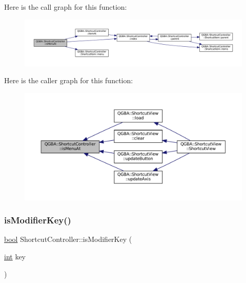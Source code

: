 Here is the call graph for this function\+:
\nopagebreak
\begin{figure}[H]
\begin{center}
\leavevmode
\includegraphics[width=350pt]{class_q_g_b_a_1_1_shortcut_controller_afcb396dd1166444596103d04c85b5b7d_cgraph}
\end{center}
\end{figure}
Here is the caller graph for this function\+:
\nopagebreak
\begin{figure}[H]
\begin{center}
\leavevmode
\includegraphics[width=350pt]{class_q_g_b_a_1_1_shortcut_controller_afcb396dd1166444596103d04c85b5b7d_icgraph}
\end{center}
\end{figure}
\mbox{\label{class_q_g_b_a_1_1_shortcut_controller_aabad72de91824aeebe6593dfb16c1845}} 
\subsubsection{\texorpdfstring{is\+Modifier\+Key()}{isModifierKey()}}
{\footnotesize\ttfamily \mbox{\hyperlink{libretro_8h_a4a26dcae73fb7e1528214a068aca317e}{bool}} Shortcut\+Controller\+::is\+Modifier\+Key (\begin{DoxyParamCaption}\item[{\mbox{\hyperlink{ioapi_8h_a787fa3cf048117ba7123753c1e74fcd6}{int}}}]{key }\end{DoxyParamCaption})\hspace{0.3cm}{\ttfamily [static]}}

